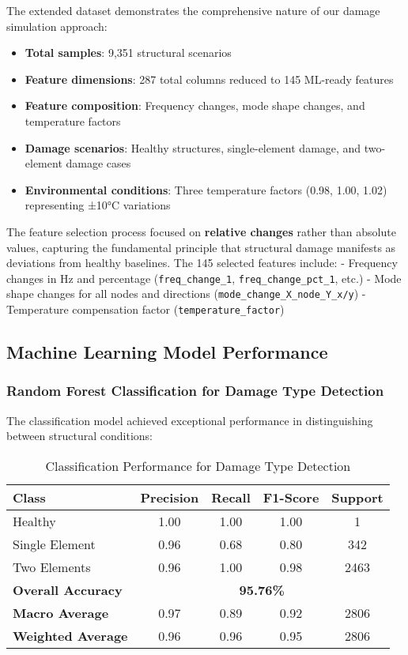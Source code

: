 \documentclass[11pt,a4paper]{article}
\begin{document}
The extended dataset demonstrates the comprehensive nature of our damage simulation approach:

\begin{itemize}
    \item \textbf{Total samples}: 9,351 structural scenarios
    \item \textbf{Feature dimensions}: 287 total columns reduced to 145 ML-ready features
    \item \textbf{Feature composition}: Frequency changes, mode shape changes, and temperature factors
    \item \textbf{Damage scenarios}: Healthy structures, single-element damage, and two-element damage cases
    \item \textbf{Environmental conditions}: Three temperature factors (0.98, 1.00, 1.02) representing ±10°C variations
\end{itemize}

The feature selection process focused on \textbf{relative changes} rather than absolute values, capturing the fundamental principle that structural damage manifests as deviations from healthy baselines. The 145 selected features include:
- Frequency changes in Hz and percentage (\texttt{freq\_change\_1}, \texttt{freq\_change\_pct\_1}, etc.)
- Mode shape changes for all nodes and directions (\texttt{mode\_change\_X\_node\_Y\_x/y})
- Temperature compensation factor (\texttt{temperature\_factor})

\subsection{Machine Learning Model Performance}

\subsubsection{Random Forest Classification for Damage Type Detection}

The classification model achieved exceptional performance in distinguishing between structural conditions:

\begin{table}[H]
\centering
\begin{tabular}{lcccc}
\toprule
\textbf{Class} & \textbf{Precision} & \textbf{Recall} & \textbf{F1-Score} & \textbf{Support} \\
\midrule
Healthy & 1.00 & 1.00 & 1.00 & 1 \\
Single Element & 0.96 & 0.68 & 0.80 & 342 \\
Two Elements & 0.96 & 1.00 & 0.98 & 2463 \\
\midrule
\textbf{Overall Accuracy} & \multicolumn{4}{c}{\textbf{95.76\%}} \\
\textbf{Macro Average} & 0.97 & 0.89 & 0.92 & 2806 \\
\textbf{Weighted Average} & 0.96 & 0.96 & 0.95 & 2806 \\
\bottomrule
\end{tabular}
\caption{Classification Performance for Damage Type Detection}
\label{tab:classification_results}
\end{table}
\end{document}
